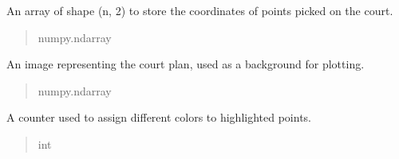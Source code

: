 \documentclass[letterpaper,10pt,english]{sphinxmanual}
\begin{document}
\begin{fulllineitems}
\begin{fulllineitems}
\end{fulllineitems}


\begin{fulllineitems}
\label{\detokenize{CameraUtils:CameraUtils.PlotCameras.points}}
\pysigstartsignatures
{}
\pysigstopsignatures
\sphinxAtStartPar
An array of shape (n, 2) to store the coordinates of points picked on the court.
\begin{quote}\begin{description}
\sphinxAtStartPar
numpy.ndarray

\end{description}\end{quote}

\end{fulllineitems}


\begin{fulllineitems}
\label{\detokenize{CameraUtils:CameraUtils.PlotCameras.court_plan}}
\pysigstartsignatures
{}
\pysigstopsignatures
\sphinxAtStartPar
An image representing the court plan, used as a background for plotting.
\begin{quote}\begin{description}
\sphinxAtStartPar
numpy.ndarray

\end{description}\end{quote}

\end{fulllineitems}


\begin{fulllineitems}
\label{\detokenize{CameraUtils:CameraUtils.PlotCameras.color_counter}}
\pysigstartsignatures
{}
\pysigstopsignatures
\sphinxAtStartPar
A counter used to assign different colors to highlighted points.
\begin{quote}\begin{description}
\sphinxAtStartPar
int


\end{description}
\end{quote}
\end{fulllineitems}
\end{fulllineitems}
\end{document}
